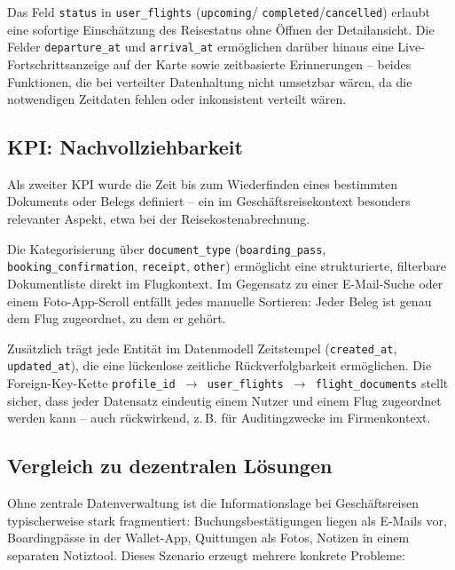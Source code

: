 Das Feld \texttt{status} in \texttt{user\_flights} (\texttt{upcoming}/
\texttt{completed}/\texttt{cancelled}) erlaubt eine sofortige Einschätzung
des Reisestatus ohne Öffnen der Detailansicht.
Die Felder \texttt{departure\_at} und \texttt{arrival\_at} ermöglichen darüber
hinaus eine Live-Fortschrittsanzeige auf der Karte sowie zeitbasierte
Erinnerungen -- beides Funktionen, die bei verteilter Datenhaltung nicht
umsetzbar wären, da die notwendigen Zeitdaten fehlen oder inkonsistent verteilt wären.

\subsection{KPI: Nachvollziehbarkeit}

Als zweiter KPI wurde die Zeit bis zum Wiederfinden eines bestimmten Dokuments
oder Belegs definiert -- ein im Geschäftsreisekontext besonders relevanter Aspekt,
etwa bei der Reisekostenabrechnung.

Die Kategorisierung über \texttt{document\_type} (\texttt{boarding\_pass},
\texttt{booking\_confirmation}, \texttt{receipt}, \texttt{other}) ermöglicht
eine strukturierte, filterbare Dokumentliste direkt im Flugkontext.
Im Gegensatz zu einer E-Mail-Suche oder einem Foto-App-Scroll entfällt jedes
manuelle Sortieren: Jeder Beleg ist genau dem Flug zugeordnet, zu dem er gehört.

Zusätzlich trägt jede Entität im Datenmodell Zeitstempel (\texttt{created\_at},
\texttt{updated\_at}), die eine lückenlose zeitliche Rückverfolgbarkeit ermöglichen.
Die Foreign-Key-Kette \texttt{profile\_id $\to$ user\_flights $\to$ flight\_documents}
stellt sicher, dass jeder Datensatz eindeutig einem Nutzer und einem Flug zugeordnet
werden kann -- auch rückwirkend, z.\,B. für Auditingzwecke im Firmenkontext.

\subsection{Vergleich zu dezentralen Lösungen}

Ohne zentrale Datenverwaltung ist die Informationslage bei Geschäftsreisen
typischerweise stark fragmentiert: Buchungsbestätigungen liegen als E-Mails vor,
Boardingpässe in der Wallet-App, Quittungen als Fotos, Notizen in einem separaten
Notiztool.
Dieses Szenario erzeugt mehrere konkrete Probleme:


